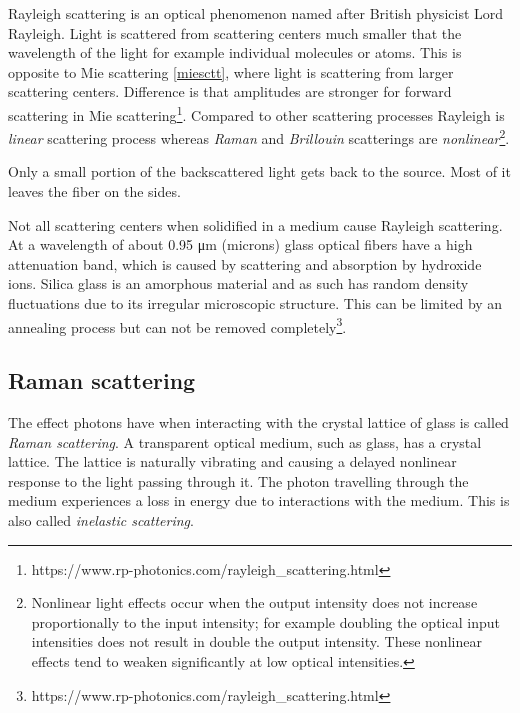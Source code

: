 Rayleigh scattering is an optical phenomenon named after British physicist Lord Rayleigh. Light is scattered from scattering centers much smaller that the wavelength of the light for example individual molecules or atoms. This is opposite to Mie scattering \ref{miesctt}, where light is scattering from larger scattering centers. Difference is that amplitudes are stronger for forward scattering in Mie scattering\footnote{https://www.rp-photonics.com/rayleigh\_scattering.html}. Compared to other scattering processes Rayleigh is \textit{linear} scattering process whereas \textit{Raman} and \textit{Brillouin} scatterings are \textit{nonlinear}\footnote{Nonlinear light effects occur when the output intensity does not increase proportionally to the input intensity; for example doubling the optical input intensities does not result in double the output intensity. These nonlinear effects tend to weaken significantly at low optical intensities.}.

Only a small portion of the backscattered light gets back to the source. Most of it leaves the fiber on the sides. 


Not all scattering centers when solidified in a medium cause Rayleigh scattering. At a wavelength of about 0.95 μm (microns) glass optical fibers have a high attenuation band, which is caused by scattering and absorption by hydroxide ions\cite{scatteringcenterbook}. Silica glass is an amorphous material and as such has random density fluctuations due to its irregular microscopic structure. This can be limited by an annealing process but can not be removed completely\footnote{https://www.rp-photonics.com/rayleigh\_scattering.html}.






\subsection{Raman scattering}

The effect photons have when interacting with the crystal lattice of glass is called \textit{Raman scattering}. A transparent optical medium, such as glass, has a crystal lattice. The lattice is naturally vibrating and causing a delayed nonlinear response to the light passing through it. The photon travelling through the medium experiences a loss in energy due to interactions with the medium. This is also called \textit{inelastic scattering}. 


